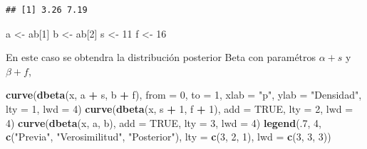 \documentclass[
  12pt,
]{book}
\newenvironment{Shaded}{\begin{snugshade}}{\end{snugshade}}
\newcommand{\DataTypeTok}[1]{\textcolor[rgb]{0.13,0.29,0.53}{#1}}
\newcommand{\DecValTok}[1]{\textcolor[rgb]{0.00,0.00,0.81}{#1}}
\newcommand{\KeywordTok}[1]{\textcolor[rgb]{0.13,0.29,0.53}{\textbf{#1}}}
\newcommand{\NormalTok}[1]{#1}
\newcommand{\OperatorTok}[1]{\textcolor[rgb]{0.81,0.36,0.00}{\textbf{#1}}}
\newcommand{\OtherTok}[1]{\textcolor[rgb]{0.56,0.35,0.01}{#1}}
\newcommand{\StringTok}[1]{\textcolor[rgb]{0.31,0.60,0.02}{#1}}
\begin{document}
\begin{verbatim}
## [1] 3.26 7.19
\end{verbatim}

\begin{Shaded}
\begin{Highlighting}[]
\NormalTok{a \textless{}{-}}\StringTok{ }\NormalTok{ab[}\DecValTok{1}\NormalTok{]}
\NormalTok{b \textless{}{-}}\StringTok{ }\NormalTok{ab[}\DecValTok{2}\NormalTok{]}
\NormalTok{s \textless{}{-}}\StringTok{ }\DecValTok{11}
\NormalTok{f \textless{}{-}}\StringTok{ }\DecValTok{16}
\end{Highlighting}
\end{Shaded}

En este caso se obtendra la distribución posterior Beta con paramétros \(\alpha + s\) y \(\beta + f\),

\begin{Shaded}
\begin{Highlighting}[]
\KeywordTok{curve}\NormalTok{(}\KeywordTok{dbeta}\NormalTok{(x, a }\OperatorTok{+}\StringTok{ }\NormalTok{s, b }\OperatorTok{+}\StringTok{ }\NormalTok{f), }\DataTypeTok{from =} \DecValTok{0}\NormalTok{, }\DataTypeTok{to =} \DecValTok{1}\NormalTok{,}
  \DataTypeTok{xlab =} \StringTok{"p"}\NormalTok{, }\DataTypeTok{ylab =} \StringTok{"Densidad"}\NormalTok{, }\DataTypeTok{lty =} \DecValTok{1}\NormalTok{, }\DataTypeTok{lwd =} \DecValTok{4}\NormalTok{)}
\KeywordTok{curve}\NormalTok{(}\KeywordTok{dbeta}\NormalTok{(x, s }\OperatorTok{+}\StringTok{ }\DecValTok{1}\NormalTok{, f }\OperatorTok{+}\StringTok{ }\DecValTok{1}\NormalTok{), }\DataTypeTok{add =} \OtherTok{TRUE}\NormalTok{, }\DataTypeTok{lty =} \DecValTok{2}\NormalTok{, }\DataTypeTok{lwd =} \DecValTok{4}\NormalTok{)}
\KeywordTok{curve}\NormalTok{(}\KeywordTok{dbeta}\NormalTok{(x, a, b), }\DataTypeTok{add =} \OtherTok{TRUE}\NormalTok{, }\DataTypeTok{lty =} \DecValTok{3}\NormalTok{, }\DataTypeTok{lwd =} \DecValTok{4}\NormalTok{)}
\KeywordTok{legend}\NormalTok{(.}\DecValTok{7}\NormalTok{, }\DecValTok{4}\NormalTok{, }\KeywordTok{c}\NormalTok{(}\StringTok{"Previa"}\NormalTok{, }\StringTok{"Verosimilitud"}\NormalTok{, }\StringTok{"Posterior"}\NormalTok{),}
  \DataTypeTok{lty =} \KeywordTok{c}\NormalTok{(}\DecValTok{3}\NormalTok{, }\DecValTok{2}\NormalTok{, }\DecValTok{1}\NormalTok{), }\DataTypeTok{lwd =} \KeywordTok{c}\NormalTok{(}\DecValTok{3}\NormalTok{, }\DecValTok{3}\NormalTok{, }\DecValTok{3}\NormalTok{))}
\end{Highlighting}
\end{Shaded}
\end{document}
